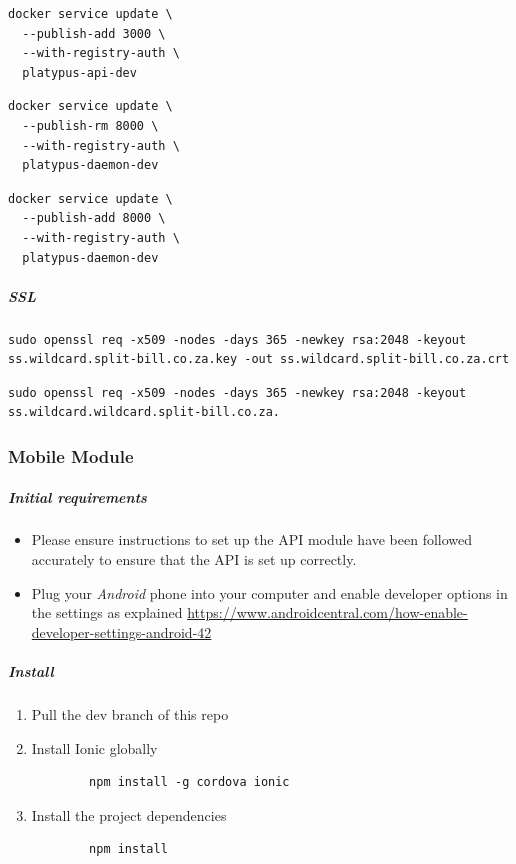 \documentclass[12pt,a4paper]{article}
\begin{document}
\begin{lstlisting}
docker service update \
  --publish-add 3000 \
  --with-registry-auth \
  platypus-api-dev
\end{lstlisting}

\begin{lstlisting}
docker service update \
  --publish-rm 8000 \
  --with-registry-auth \
  platypus-daemon-dev
\end{lstlisting}

\begin{lstlisting}
docker service update \
  --publish-add 8000 \
  --with-registry-auth \
  platypus-daemon-dev
\end{lstlisting}


\subparagraph{SSL}
\subparagraph{}

\begin{lstlisting}
sudo openssl req -x509 -nodes -days 365 -newkey rsa:2048 -keyout ss.wildcard.split-bill.co.za.key -out ss.wildcard.split-bill.co.za.crt
\end{lstlisting}

\begin{lstlisting}
sudo openssl req -x509 -nodes -days 365 -newkey rsa:2048 -keyout ss.wildcard.wildcard.split-bill.co.za.
\end{lstlisting}

    \subsubsection{Mobile Module}
   \subparagraph{Initial requirements}
\begin{itemize}
\item Please ensure instructions to set up the API module have been followed accurately to ensure that the API is set up correctly.
\item Plug your \emph{Android} phone into your computer and enable developer options in the settings as explained 
\url {https://www.androidcentral.com/how-enable-developer-settings-android-42}
\end{itemize}



\subparagraph{Install}
\begin{enumerate}
\item Pull the dev branch of this repo
\item Install Ionic globally
	\begin{lstlisting}
		npm install -g cordova ionic
	\end{lstlisting}
\item Install the project dependencies
\begin{lstlisting}
		npm install
	\end{lstlisting}
\end{enumerate}
\end{document}
